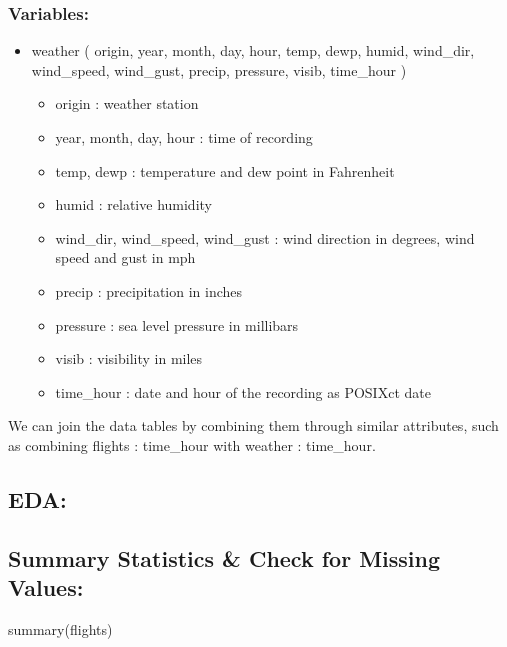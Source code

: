 \documentclass[
  10pt,
  letterpaper,
  DIV=11,
  numbers=noendperiod]{scrartcl}
\newenvironment{Shaded}{\begin{snugshade}}{\end{snugshade}}
\newcommand{\FunctionTok}[1]{\textcolor[rgb]{0.28,0.35,0.67}{#1}}
\newcommand{\NormalTok}[1]{\textcolor[rgb]{0.00,0.23,0.31}{#1}}
\providecommand{\tightlist}{%
  \setlength{\itemsep}{0pt}\setlength{\parskip}{0pt}}\usepackage{longtable,booktabs,array}
\begin{document}
\subsubsection{Variables:}\label{variables-4}

\begin{itemize}
\tightlist
\item
  weather ( origin, year, month, day, hour, temp, dewp, humid,
  wind\_dir, wind\_speed, wind\_gust, precip, pressure, visib,
  time\_hour )

  \begin{itemize}
  \tightlist
  \item
    origin : weather station
  \item
    year, month, day, hour : time of recording
  \item
    temp, dewp : temperature and dew point in Fahrenheit
  \item
    humid : relative humidity
  \item
    wind\_dir, wind\_speed, wind\_gust : wind direction in degrees, wind
    speed and gust in mph
  \item
    precip : precipitation in inches
  \item
    pressure : sea level pressure in millibars
  \item
    visib : visibility in miles
  \item
    time\_hour : date and hour of the recording as POSIXct date
  \end{itemize}
\end{itemize}

We can join the data tables by combining them through similar
attributes, such as combining flights : time\_hour with weather :
time\_hour.

\subsection{EDA:}\label{eda}

\subsection{Summary Statistics \& Check for Missing
Values:}\label{summary-statistics-check-for-missing-values}

\begin{Shaded}
\begin{Highlighting}[numbers=left,,]
\FunctionTok{summary}\NormalTok{(flights)}
\end{Highlighting}
\end{Shaded}
\end{document}
